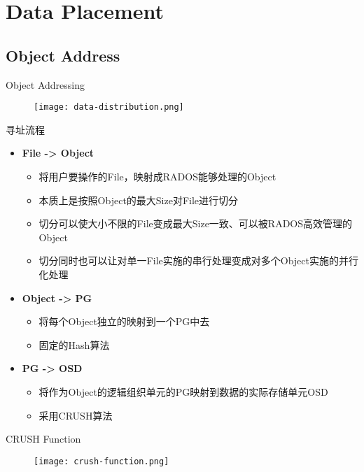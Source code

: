 \section{Data Placement}

\subsection{Object Address}

\begin{frame}{Object Addressing}
    \begin{figure}[htpb]
        \centering
        \texttt{[image: data-distribution.png]}
    \end{figure}
\end{frame}

\begin{frame}{寻址流程}
    \begin{itemize}
        \item \textbf{File -> Object}
            \begin{itemize}
                \item 将用户要操作的File，映射成RADOS能够处理的Object
                \item 本质上是按照Object的最大Size对File进行切分
                \item 切分可以使大小不限的File变成最大Size一致、可以被RADOS高效管理的Object
                \item 切分同时也可以让对单一File实施的串行处理变成对多个Object实施的并行化处理
            \end{itemize}
        \item \textbf{Object -> PG}
            \begin{itemize}
                \item 将每个Object独立的映射到一个PG中去
                \item 固定的Hash算法
            \end{itemize}
        \item \textbf{PG -> OSD}
            \begin{itemize}
                \item 将作为Object的逻辑组织单元的PG映射到数据的实际存储单元OSD
                \item 采用CRUSH算法
            \end{itemize}
    \end{itemize}
\end{frame}

\begin{frame}{CRUSH Function}
    \begin{figure}[htpb]
        \centering
        \texttt{[image: crush-function.png]}
    \end{figure}
\end{frame}

